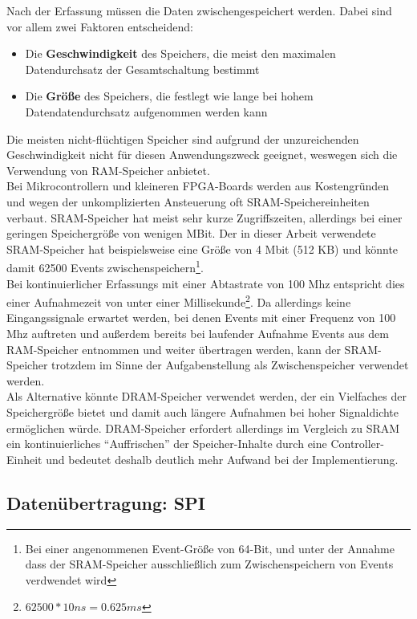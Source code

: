 Nach der Erfassung müssen die Daten zwischengespeichert werden. Dabei sind vor allem zwei Faktoren entscheidend:
\begin{itemize} 
	\item Die \textbf{Geschwindigkeit} des Speichers, die meist den maximalen Datendurchsatz der Gesamtschaltung bestimmt
	\item Die \textbf{Größe} des Speichers, die festlegt wie lange bei hohem Datendatendurchsatz aufgenommen werden kann 
\end{itemize}
Die meisten nicht-flüchtigen Speicher sind aufgrund der unzureichenden Geschwindigkeit nicht für diesen Anwendungszweck geeignet, weswegen sich die Verwendung von \acrshort{RAM}-Speicher anbietet. \\
Bei Mikrocontrollern und kleineren FPGA-Boards werden aus Kostengründen und wegen der unkomplizierten Ansteuerung oft SRAM-Speichereinheiten verbaut. SRAM-Speicher hat meist sehr kurze Zugriffszeiten, allerdings bei einer geringen Speichergröße von wenigen MBit. Der in dieser Arbeit verwendete SRAM-Speicher hat beispielsweise eine Größe von 4 Mbit (512 KB) und könnte damit 62500 Events zwischenspeichern\footnote{Bei einer angenommenen Event-Größe von 64-Bit, und unter der Annahme dass der SRAM-Speicher ausschließlich zum Zwischenspeichern von Events verdwendet wird}.\\
Bei kontinuierlicher Erfassungs mit einer Abtastrate von 100 Mhz entspricht dies einer Aufnahmezeit von unter einer Millisekunde\footnote{$62500 * 10 ns = 0.625 ms$}. Da allerdings keine Eingangssignale erwartet werden, bei denen Events mit einer Frequenz von 100 Mhz auftreten und außerdem bereits bei laufender Aufnahme Events aus dem RAM-Speicher entnommen und weiter übertragen werden, kann der SRAM-Speicher trotzdem im Sinne der Aufgabenstellung als Zwischenspeicher verwendet werden.\\
Als Alternative könnte DRAM-Speicher verwendet werden, der ein Vielfaches der Speichergröße bietet und damit auch längere Aufnahmen bei hoher Signaldichte ermöglichen würde. DRAM-Speicher erfordert allerdings im Vergleich zu SRAM ein kontinuierliches ``Auffrischen'' der Speicher-Inhalte durch eine Controller-Einheit und bedeutet deshalb deutlich mehr Aufwand bei der Implementierung.


\subsection{Datenübertragung: SPI}

